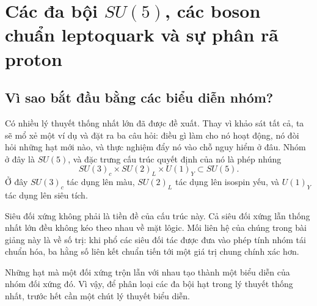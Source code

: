\chapter{Các đa bội \texorpdfstring{\(SU(5)\)}{SU(5)}, các boson chuẩn leptoquark và sự phân rã proton}


\section{Vì sao bắt đầu bằng các biểu diễn nhóm?}

Có nhiều lý thuyết thống nhất lớn đã được đề xuất. Thay vì khảo sát tất cả, ta sẽ mổ xẻ một ví dụ và đặt ra ba câu hỏi: điều gì làm cho nó hoạt động, nó đòi hỏi những hạt mới nào, và thực nghiệm đẩy nó vào chỗ nguy hiểm ở đâu. Nhóm ở đây là \(SU(5)\), và đặc trưng cấu trúc quyết định của nó là phép nhúng
\begin{equation}
SU(3)_c\times SU(2)_L\times U(1)_Y
\subset SU(5).
\label{eq:l10-sm-embedding}
\end{equation}
Ở đây \(SU(3)_c\) tác dụng lên màu, \(SU(2)_L\) tác dụng lên isospin yếu, và \(U(1)_Y\) tác dụng lên siêu tích.

Siêu đối xứng không phải là tiền đề của cấu trúc này. Cả siêu đối xứng lẫn thống nhất lớn đều không kéo theo nhau về mặt lôgic. Mối liên hệ của chúng trong bài giảng này là về số trị: khi phổ các siêu đối tác được đưa vào phép tính nhóm tái chuẩn hóa, ba hằng số liên kết chuẩn tiến tới một giá trị chung chính xác hơn.

Những hạt mà một đối xứng trộn lẫn với nhau tạo thành một biểu diễn của nhóm đối xứng đó. Vì vậy, để phân loại các đa bội hạt trong lý thuyết thống nhất, trước hết cần một chút lý thuyết biểu diễn.

